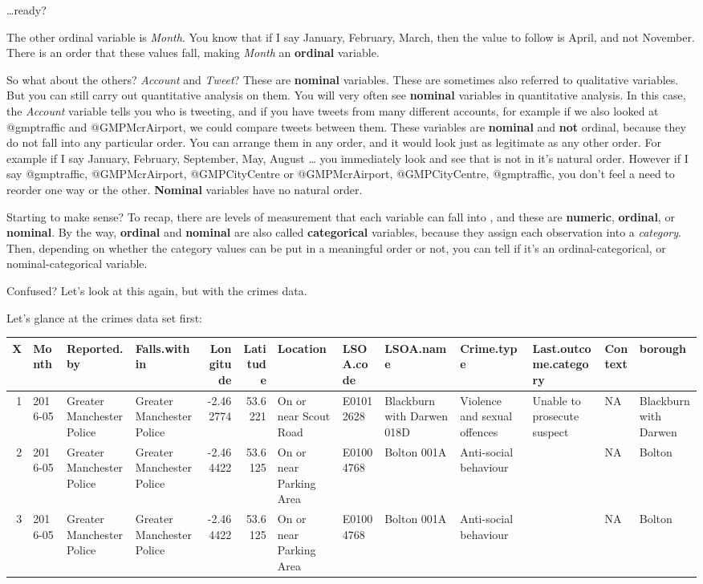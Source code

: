 \documentclass[
]{book}
\begin{document}
\ldots ready?

The other ordinal variable is \emph{Month}. You know that if I say January, February, March, then the value to follow is April, and not November. There is an order that these values fall, making \emph{Month} an \textbf{ordinal} variable.

So what about the others? \emph{Account} and \emph{Tweet}? These are \textbf{nominal} variables. These are sometimes also referred to qualitative variables. But you can still carry out quantitative analysis on them. You will very often see \textbf{nominal} variables in quantitative analysis. In this case, the \emph{Account} variable tells you who is tweeting, and if you have tweets from many different accounts, for example if we also looked at @gmptraffic and @GMPMcrAirport, we could compare tweets between them. These variables are \textbf{nominal} and \textbf{not} ordinal, because they do not fall into any particular order. You can arrange them in any order, and it would look just as legitimate as any other order. For example if I say January, February, September, May, August \ldots{} you immediately look and see that is not in it's natural order. However if I say @gmptraffic, @GMPMcrAirport, @GMPCityCentre or @GMPMcrAirport, @GMPCityCentre, @gmptraffic, you don't feel a need to reorder one way or the other. \textbf{Nominal} variables have no natural order.

Starting to make sense? To recap, there are levels of measurement that each variable can fall into , and these are \textbf{numeric}, \textbf{ordinal}, or \textbf{nominal}. By the way, \textbf{ordinal} and \textbf{nominal} are also called \textbf{categorical} variables, because they assign each observation into a \emph{category}. Then, depending on whether the category values can be put in a meaningful order or not, you can tell if it's an ordinal-categorical, or nominal-categorical variable.

Confused? Let's look at this again, but with the crimes data.

Let's glance at the crimes data set first:

\begin{tabular}{r|l|l|l|r|r|l|l|l|l|l|l|l}
\hline
X & Month & Reported.by & Falls.within & Longitude & Latitude & Location & LSOA.code & LSOA.name & Crime.type & Last.outcome.category & Context & borough\\
\hline
1 & 2016-05 & Greater Manchester Police & Greater Manchester Police & -2.462774 & 53.6221 & On or near Scout Road & E01012628 & Blackburn with Darwen 018D & Violence and sexual offences & Unable to prosecute suspect & NA & Blackburn with Darwen\\
\hline
2 & 2016-05 & Greater Manchester Police & Greater Manchester Police & -2.464422 & 53.6125 & On or near Parking Area & E01004768 & Bolton 001A & Anti-social behaviour &  & NA & Bolton\\
\hline
3 & 2016-05 & Greater Manchester Police & Greater Manchester Police & -2.464422 & 53.6125 & On or near Parking Area & E01004768 & Bolton 001A & Anti-social behaviour &  & NA & Bolton\\
\hline
\end{tabular}
\end{document}
